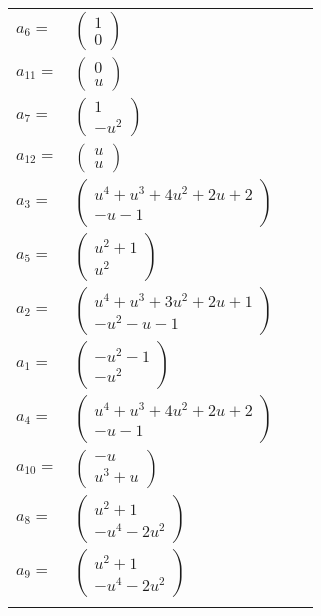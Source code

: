 \documentclass[1p]{elsarticle_modified}
\theoremstyle{definition}
\begin{document}
\begin{tabular}{m{7pt} m{180pt} m{7pt} m{180pt} }
\flushright $a_{6}=$&$\begin{pmatrix}1\\0\end{pmatrix}$ \\
\flushright $a_{11}=$&$\begin{pmatrix}0\\u\end{pmatrix}$ \\
\flushright $a_{7}=$&$\begin{pmatrix}1\\- u^2\end{pmatrix}$ \\
\flushright $a_{12}=$&$\begin{pmatrix}u\\u\end{pmatrix}$ \\
\flushright $a_{3}=$&$\begin{pmatrix}u^4+u^3+4 u^2+2 u+2\\- u-1\end{pmatrix}$ \\
\flushright $a_{5}=$&$\begin{pmatrix}u^2+1\\u^2\end{pmatrix}$ \\
\flushright $a_{2}=$&$\begin{pmatrix}u^4+u^3+3 u^2+2 u+1\\- u^2- u-1\end{pmatrix}$ \\
\flushright $a_{1}=$&$\begin{pmatrix}- u^2-1\\- u^2\end{pmatrix}$ \\
\flushright $a_{4}=$&$\begin{pmatrix}u^4+u^3+4 u^2+2 u+2\\- u-1\end{pmatrix}$ \\
\flushright $a_{10}=$&$\begin{pmatrix}- u\\u^3+u\end{pmatrix}$ \\
\flushright $a_{8}=$&$\begin{pmatrix}u^2+1\\- u^4-2 u^2\end{pmatrix}$ \\
\flushright $a_{9}=$&$\begin{pmatrix}u^2+1\\- u^4-2 u^2\end{pmatrix}$\\&\end{tabular}
\end{document}
